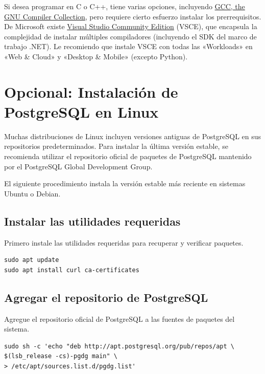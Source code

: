 Si desea programar en C o C++, tiene varias opciones, incluyendo \href{https://gcc.gnu.org}{GCC, the GNU Compiler Collection}, pero requiere cierto esfuerzo instalar los prerrequisitos. De Microsoft existe \href{https://visualstudio.microsoft.com/vs/community/}{Visual Studio Community Edition} (VSCE), que encapsula la complejidad de instalar múltiples compiladores (incluyendo el SDK del marco de trabajo .NET). Le recomiendo que instale VSCE con todas las «Workloads» en «Web \& Cloud» y «Desktop \& Mobile» (excepto Python).

\section{Opcional: Instalación de PostgreSQL en Linux}
Muchas distribuciones de Linux incluyen versiones antiguas de PostgreSQL en sus
repositorios predeterminados. Para instalar la última versión estable, se recomienda
utilizar el repositorio oficial de paquetes de PostgreSQL mantenido por el
PostgreSQL Global Development Group.

El siguiente procedimiento instala la versión estable más reciente en
sistemas Ubuntu o Debian.

\subsection{Instalar las utilidades requeridas}
Primero instale las utilidades requeridas para recuperar y verificar paquetes.

\begin{lstlisting}[basicstyle=\footnotesize\ttfamily]
sudo apt update
sudo apt install curl ca-certificates
\end{lstlisting}

\subsection{Agregar el repositorio de PostgreSQL}
Agregue el repositorio oficial de PostgreSQL a las fuentes de paquetes del sistema.

\begin{lstlisting}[basicstyle=\footnotesize\ttfamily]
sudo sh -c 'echo "deb http://apt.postgresql.org/pub/repos/apt \
$(lsb_release -cs)-pgdg main" \
> /etc/apt/sources.list.d/pgdg.list'
\end{lstlisting}

